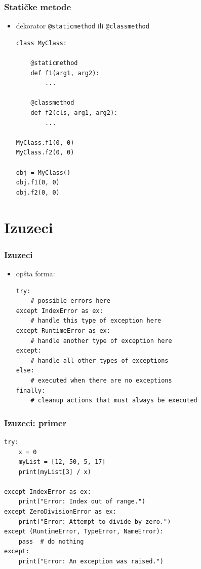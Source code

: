\documentclass[compress]{beamer}
\begin{document}
\begin{frame}[fragile]
\frametitle{Statičke metode}
\begin{itemize}
  \item dekorator \texttt{@staticmethod} ili \texttt{@classmethod}
\begin{verbatim}
class MyClass:
    
    @staticmethod
    def f1(arg1, arg2):
        ...

    @classmethod
    def f2(cls, arg1, arg2):
        ...
    
MyClass.f1(0, 0)
MyClass.f2(0, 0)

obj = MyClass()
obj.f1(0, 0)
obj.f2(0, 0)
\end{verbatim}
\end{itemize}
\end{frame}
  
\section{Izuzeci}

\begin{frame}[fragile]
\frametitle{Izuzeci}
\begin{itemize}
  \item opšta forma:
\begin{verbatim}
try:
    # possible errors here
except IndexError as ex:
    # handle this type of exception here
except RuntimeError as ex:
    # handle another type of exception here
except:
    # handle all other types of exceptions
else:
    # executed when there are no exceptions
finally:
    # cleanup actions that must always be executed
\end{verbatim}
\end{itemize}
\end{frame}

\begin{frame}[fragile]
\frametitle{Izuzeci: primer}
\begin{verbatim}
try:
    x = 0
    myList = [12, 50, 5, 17]
    print(myList[3] / x)

except IndexError as ex:
    print("Error: Index out of range.")
except ZeroDivisionError as ex:
    print("Error: Attempt to divide by zero.")
except (RuntimeError, TypeError, NameError):
    pass  # do nothing
except:
    print("Error: An exception was raised.")
\end{verbatim}
\end{frame}
\end{document}
